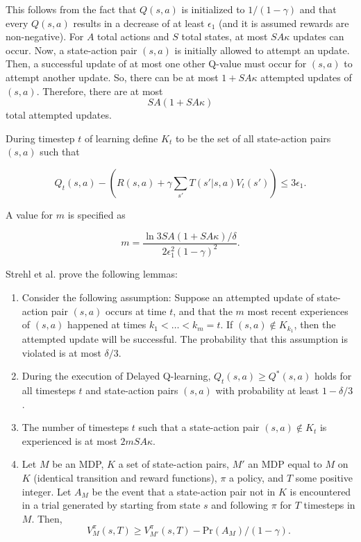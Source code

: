 \documentclass{article} %
\begin{document}
This follows from the fact that $Q(s,a)$ is initialized to $1/(1-\gamma)$ and that every $Q(s,a)$ results in a decrease of at least $\epsilon_1$ (and it is assumed rewards are non-negative).  For $A$ total actions and $S$ total states, at most $SA\kappa$ updates can occur.  Now, a state-action pair $(s,a)$ is initially allowed to attempt an update.  Then, a successful update of at most one other Q-value must occur  for $(s,a)$ to attempt another update.  So, there can be at most $1+SA\kappa$ attempted updates of $(s,a)$.  Therefore, there are at most
$$SA(1+SA\kappa)$$
total attempted updates.

During timestep $t$ of learning define $K_t$ to be the set of all state-action pairs $(s,a)$ such that 

$$Q_t(s,a) - \left(R(s,a)+\gamma\sum_{s'}T(s'|s,a)V_t(s')\right) \leq 3\epsilon_1.$$

A value for $m$ is specified as 

$$m=\frac{\ln{3SA(1+SA\kappa)/\delta}}{2\epsilon_1^2(1-\gamma)^2}.$$

Strehl et al. prove the following lemmas:

\begin{enumerate}

\item Consider the following assumption:  Suppose an attempted update of state-action pair $(s,a)$ occurs at time $t$, and that the $m$ most recent experiences of $(s,a)$ happened at times $k_1 < \dots < k_m = t$.  If $(s,a) \notin K_{k_1}$, then the attempted update will be successful.  The probability that this assumption is violated is at most $\delta/3$.  


\item During the execution of Delayed Q-learning, $Q_t(s,a) \geq Q^*(s,a)$ holds for all timesteps $t$ and state-action pairs $(s,a)$ with probability at least $1-\delta/3$.

\item The number of timesteps $t$ such that a state-action pair $(s,a) \notin K_t$ is experienced is at most $2mSA\kappa$.

\item Let $M$ be an MDP, $K$ a set of state-action pairs, $M'$ an MDP equal to $M$ on $K$ (identical transition and reward functions), $\pi$ a policy, and
$T$ some positive integer. Let $A_M$ be the event that a state-action pair not in $K$ is encountered in a trial generated by starting from state $s$ and following $\pi$ for $T$ timesteps in $M$. Then,
$$V_M^\pi(s,T)\geq V_{M'}^{\pi}(s,T)-\text{Pr}(A_M)/(1-\gamma).$$

\end{enumerate}
\end{document}
